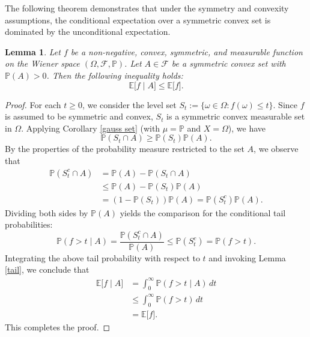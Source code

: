 \documentclass[preprint,12pt]{elsarticle}
\newtheorem{lemma}[theorem]{Lemma}
\theoremstyle{definition}
\theoremstyle{plain}
\begin{document}
The following theorem demonstrates that under the symmetry and convexity assumptions, the conditional expectation over a symmetric convex set is dominated by the unconditional expectation.

\begin{lemma}\label{conditional-expectation}
Let $f$ be a non-negative, convex, symmetric, and measurable function on the Wiener space $(\Omega, \mathcal{F}, \mathbb{P})$. Let $A \in \mathcal{F}$ be a symmetric convex set with $\mathbb{P}(A) > 0$. Then the following inequality holds:
\begin{equation*}
    \mathbb{E}\bigl[f \mid A\bigr] \le \mathbb{E}\bigl[f\bigr].
\end{equation*}
\end{lemma}

\begin{proof}
For each $t \ge 0$, we consider the level set $S_t := \{\omega \in \Omega : f(\omega) \le t\}$. Since $f$ is assumed to be symmetric and convex, $S_t$ is a symmetric convex measurable set in $\Omega$. Applying Corollary \ref{gauss set} (with $\mu = \mathbb{P}$ and $X = \Omega$), we have
\begin{equation*}
    \mathbb{P}(S_t \cap A) \ge \mathbb{P}(S_t) \mathbb{P}(A).
\end{equation*}
By the properties of the probability measure restricted to the set $A$, we observe that
\begin{align*}
    \mathbb{P}(S_t^c \cap A) &= \mathbb{P}(A) - \mathbb{P}(S_t \cap A) \\
    &\le \mathbb{P}(A) - \mathbb{P}(S_t) \mathbb{P}(A) \\
    &= (1 - \mathbb{P}(S_t)) \mathbb{P}(A) = \mathbb{P}(S_t^c) \mathbb{P}(A).
\end{align*}
Dividing both sides by $\mathbb{P}(A)$ yields the comparison for the conditional tail probabilities:
\begin{equation*}
    \mathbb{P}(f > t \mid A) = \frac{\mathbb{P}(S_t^c \cap A)}{\mathbb{P}(A)} \le \mathbb{P}(S_t^c) = \mathbb{P}(f > t).
\end{equation*}
Integrating the above tail probability with respect to $t$ and invoking Lemma \ref{tail}, we conclude that
\begin{align*}
    \mathbb{E}\bigl[f \mid A \bigr] &= \int_0^\infty \mathbb{P}(f > t \mid A) \, dt \\
    &\le \int_0^\infty \mathbb{P}(f > t) \, dt \\
    &= \mathbb{E}\bigl[f\bigr].
\end{align*}
This completes the proof.
\end{proof}
\end{document}

